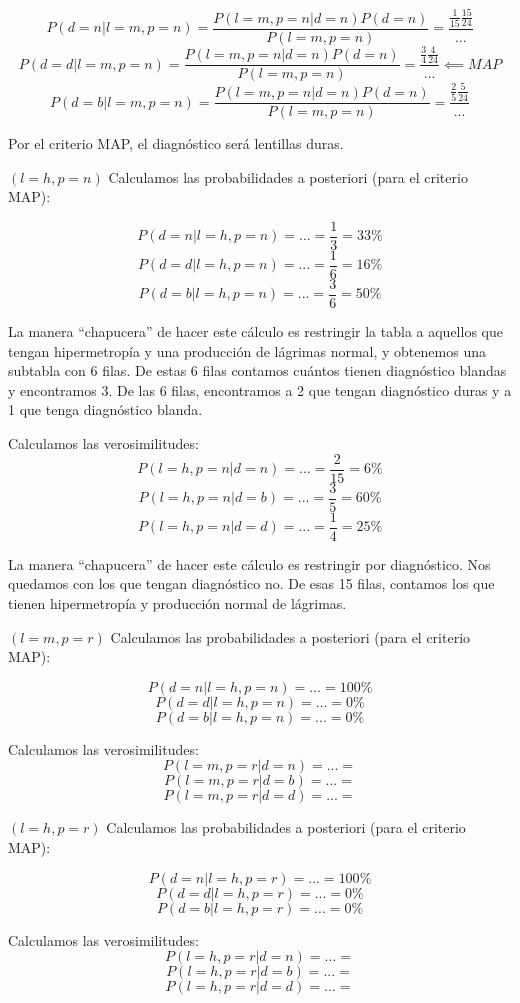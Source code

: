 \documentclass{apuntes}
\begin{document}
\begin{problem}[lentillas]
\[P(d=n | l=m, p=n ) = \frac{P(l=m, p=n | d=n) P(d=n)}{P(l=m, p=n)} = \frac{\frac{1}{15}\frac{15}{24}}{...}\]
\[P(d=d | l=m, p=n ) = \frac{P(l=m, p=n | d=n) P(d=n)}{P(l=m, p=n)} = \frac{\frac{3}{4}\frac{4}{24}}{...} \impliedby MAP\]
\[P(d=b | l=m, p=n ) = \frac{P(l=m, p=n | d=n) P(d=n)}{P(l=m, p=n)} = \frac{\frac{2}{5}\frac{5}{24}}{...}\]

Por el criterio MAP, el diagnóstico será lentillas duras.

\spart $(l=h,p=n)$ Calculamos las probabilidades a posteriori (para el criterio MAP):

\[P(d=n | l=h, p=n) = ... = \frac{1}{3} = 33\%\]
\[P(d=d | l=h, p=n) = ... = \frac{1}{6} = 16\%\]
\[P(d=b | l=h, p=n) = ... = \frac{3}{6} = 50\%\]

La manera ``chapucera'' de hacer este cálculo es restringir la tabla a aquellos que tengan hipermetropía y una producción de lágrimas normal, y obtenemos una subtabla con 6 filas. De estas 6 filas contamos cuántos tienen diagnóstico blandas y encontramos 3. De las 6 filas, encontramos a 2 que tengan diagnóstico duras y a 1 que tenga diagnóstico blanda.

Calculamos las verosimilitudes:
\[P(l=h, p=n | d=n) = ... = \frac{2}{15} = 6\%\]
\[P(l=h, p=n | d=b) = ... = \frac{3}{5} = 60\%\]
\[P(l=h, p=n | d=d) = ... = \frac{1}{4} = 25\%\]

La manera ``chapucera'' de hacer este cálculo es restringir por diagnóstico. Nos quedamos con los que tengan diagnóstico no. De esas 15 filas, contamos los que tienen hipermetropía y producción normal de lágrimas. 


\spart $(l=m, p=r)$ Calculamos las probabilidades a posteriori (para el criterio MAP):

\[P(d=n | l=h, p=n) = ... = 100\%\]
\[P(d=d | l=h, p=n) = ... = 0\%\]
\[P(d=b | l=h, p=n) = ... = 0\%\]


Calculamos las verosimilitudes:
\[P(l=m, p=r | d=n) = ... = \]
\[P(l=m, p=r | d=b) = ... = \]
\[P(l=m, p=r | d=d) = ... = \]


\spart $(l=h, p=r)$ Calculamos las probabilidades a posteriori (para el criterio MAP):

\[P(d=n | l=h, p=r) = ... = 100\%\]
\[P(d=d | l=h, p=r) = ... = 0\%\]
\[P(d=b | l=h, p=r) = ... = 0\%\]

Calculamos las verosimilitudes:
\[P(l=h, p=r | d=n) = ... = \]
\[P(l=h, p=r | d=b) = ... = \]
\[P(l=h, p=r | d=d) = ... = \]

\end{problem}
\end{document}

